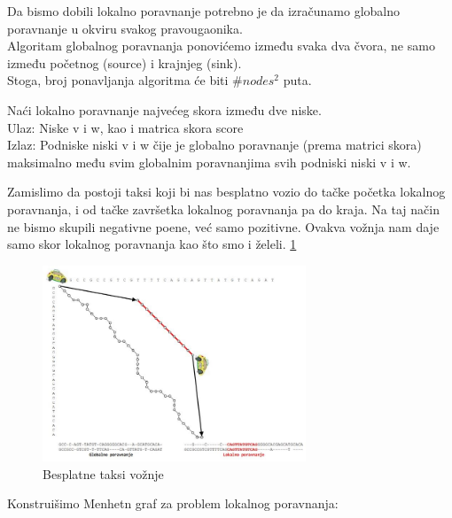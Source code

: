 \noindent Da bismo dobili lokalno poravnanje potrebno je da izračunamo globalno poravnanje u okviru svakog pravougaonika.\\
Algoritam globalnog poravnanja ponovićemo između svaka dva čvora, ne samo između početnog (source) i krajnjeg (sink). \\
Stoga, broj ponavljanja algoritma će biti $\#nodes ^ 2$ puta. \\

\begin{problem}
	Naći lokalno poravnanje najvećeg skora između dve niske. \\
	Ulaz: Niske v i w, kao i matrica skora score \\
	Izlaz: Podniske niski v i w čije je globalno poravnanje (prema matrici skora) maksimalno među svim globalnim poravnanjima svih podniski niski v i w. 
\end{problem}

\noindent Zamislimo da postoji taksi koji bi nas besplatno vozio do tačke početka lokalnog poravnanja, i od tačke završetka lokalnog poravnanja pa do kraja. Na taj način ne bismo skupili negativne poene, već samo pozitivne. Ovakva vožnja nam daje samo skor lokalnog poravnanja kao što smo i želeli. \ref{slika:taksiFree}\\
 
 \begin{figure}[H]
\centering
\includegraphics[width=0.7\textwidth]{poglavlja/5/slike/free_taxi.JPG}
\caption{Besplatne taksi vožnje}
\label{slika:taksiFree}
\end{figure} 

Konstruišimo Menhetn graf za problem lokalnog poravnanja: \\

